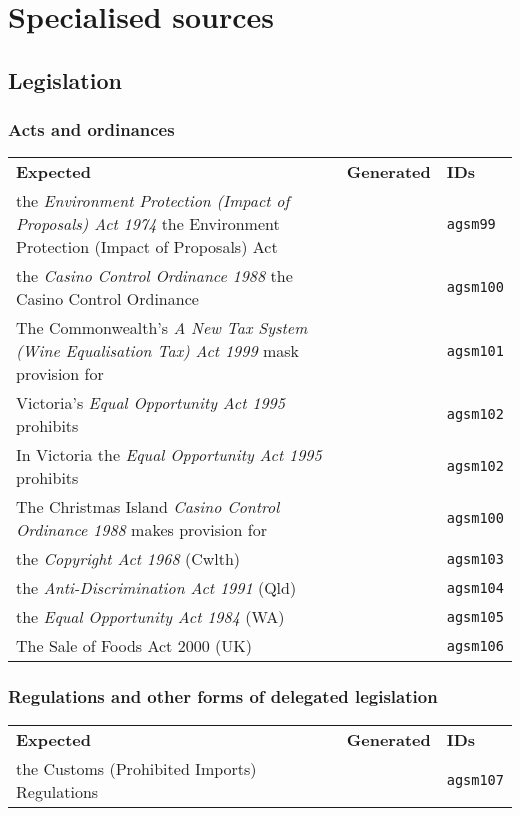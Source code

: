 \documentclass[a4paper,landscape,12pt]{article}
\newlength\q
\newlength\qr
\newenvironment{citetable}
  {\noindent\begin{longtable}{p{\q} p{\q} p{\qr}}\textbf{Expected} & \textbf{Generated} & \textbf{IDs}\\}
  {\end{longtable}}
\begin{document}
\section{Specialised sources}

\subsection{Legislation}

\subsubsection{Acts and ordinances}

\begin{citetable}
	the \textit{Environment Protection (Impact of Proposals) Act 1974} \textellipsis{} the Environment Protection (Impact of Proposals) Act \textellipsis{} & & \texttt{agsm99} \\
	the \textit{Casino Control Ordinance 1988} \textellipsis{} the Casino Control Ordinance & & \texttt{agsm100} \\
	The Commonwealth's \textit{A New Tax System (Wine Equalisation Tax) Act 1999} mask provision for & & \texttt{agsm101} \\
	Victoria's \textit{Equal Opportunity Act 1995} prohibits & & \texttt{agsm102} \\
	In Victoria the \textit{Equal Opportunity Act 1995} prohibits & & \texttt{agsm102} \\
	The Christmas Island \textit{Casino Control Ordinance 1988} makes provision for & & \texttt{agsm100} \\
	the \textit{Copyright Act 1968} (Cwlth) & & \texttt{agsm103} \\
	the \textit{Anti-Discrimination Act 1991} (Qld) & & \texttt{agsm104} \\
	the \textit{Equal Opportunity Act 1984} (WA) & & \texttt{agsm105} \\
	The Sale of Foods Act 2000 (UK) & & \texttt{agsm106} \\
\end{citetable}

\subsubsection{Regulations and other forms of delegated legislation}

\begin{citetable}
	the Customs (Prohibited Imports) Regulations & & \texttt{agsm107} \\
\end{citetable}
\end{document}
